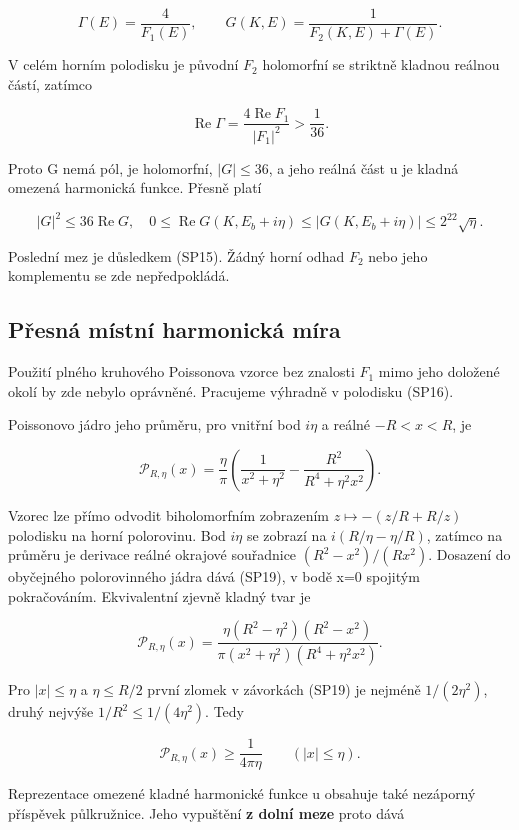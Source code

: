 \documentclass[11pt,a4paper]{article}
\theoremstyle{remark}\newtheorem{remark}[theorem]{Poznámka}
\numberwithin{equation}{section}
\begin{document}
\[
\Gamma(E)=\frac4{F_1(E)},\qquad
G(K,E)=\frac1{F_2(K,E)+\Gamma(E)}.
\tag{SP17}
\]

V celém horním polodisku je původní \(F_2\) holomorfní se striktně
kladnou reálnou částí, zatímco

\[
\operatorname{Re}\Gamma
=\frac{4\operatorname{Re}F_1}{|F_1|^2}>\frac1{36}.
\]

Proto G nemá pól, je holomorfní, \(|G|\le36\), a jeho reálná část u je
kladná omezená harmonická funkce. Přesně platí

\[
|G|^2\le36\operatorname{Re}G,
\quad
0\le\operatorname{Re}G(K,E_b+i\eta)
\le|G(K,E_b+i\eta)|\le2^{22}\sqrt\eta.
\tag{SP18}
\]

Poslední mez je důsledkem (SP15). Žádný horní odhad \(F_2\) nebo jeho
komplementu se zde nepředpokládá.

\hypertarget{pux159esnuxe1-muxedstnuxed-harmonickuxe1-muxedra}{%
\subsection{Přesná místní harmonická
míra}\label{pux159esnuxe1-muxedstnuxed-harmonickuxe1-muxedra}}

Použití plného kruhového Poissonova vzorce bez znalosti \(F_1\) mimo
jeho doložené okolí by zde nebylo oprávněné. Pracujeme výhradně v
polodisku (SP16).

Poissonovo jádro jeho průměru, pro vnitřní bod \(i\eta\) a reálné
\(-R<x<R\), je

\[
\mathcal P_{R,\eta}(x)
=\frac\eta\pi\left(
\frac1{x^2+\eta^2}-\frac{R^2}{R^4+\eta^2x^2}\right).
\tag{SP19}
\]

Vzorec lze přímo odvodit biholomorfním zobrazením \(z\mapsto-(z/R+R/z)\)
polodisku na horní polorovinu. Bod \(i\eta\) se zobrazí na
\(i(R/\eta-\eta/R)\), zatímco na průměru je derivace reálné okrajové
souřadnice \((R^2-x^2)/(Rx^2)\). Dosazení do obyčejného polorovinného
jádra dává (SP19), v bodě x=0 spojitým pokračováním. Ekvivalentní zjevně
kladný tvar je

\[
\mathcal P_{R,\eta}(x)
=\frac{\eta(R^2-\eta^2)(R^2-x^2)}
{\pi(x^2+\eta^2)(R^4+\eta^2x^2)}.
\]

Pro \(|x|\le\eta\) a \(\eta\le R/2\) první zlomek v závorkách (SP19) je
nejméně \(1/(2\eta^2)\), druhý nejvýše \(1/R^2\le1/(4\eta^2)\). Tedy

\[
\mathcal P_{R,\eta}(x)\ge\frac1{4\pi\eta}
\qquad(|x|\le\eta).
\tag{SP20}
\]

Reprezentace omezené kladné harmonické funkce u obsahuje také nezáporný
příspěvek půlkružnice. Jeho vypuštění \textbf{z dolní meze} proto dává
\end{document}
